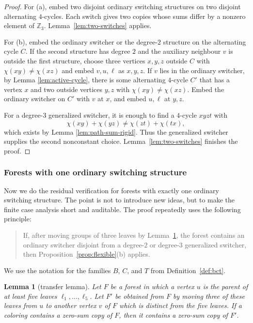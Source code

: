 \documentclass[11pt]{article}
\newtheorem{lemma}[theorem]{Lemma}
\newcommand{\Z}{\mathbb Z}
\begin{document}
\begin{proof}
For (a), embed two disjoint ordinary switching structures on two disjoint alternating $4$-cycles.  Each switch gives two copies whose sums differ by a nonzero element of $\Z_3$.  Lemma~\ref{lem:two-switches} applies.

For (b), embed the ordinary switcher or the degree-$2$ structure on the alternating cycle $C$.  If the second structure has degree $2$ and the auxiliary neighbour $v$ is outside the first structure, choose three vertices $x,y,z$ outside $C$ with $\chi(xy)\ne\chi(xz)$ and embed $v,u,\ell$ as $x,y,z$.  If $v$ lies in the ordinary switcher, by Lemma \ref{lem:active-cycle}, there is some alternating $4$-cycle $C'$ that has a vertex $x$ and two outside vertices $y,z$ with $\chi(xy)\ne\chi(xz)$.  Embed the ordinary switcher on $C'$ with $v$ at $x$, and embed $u,\ell$ at $y,z$.

For a degree-$3$ generalized switcher, it is enough to find a $4$-cycle $xyzt$ with
\[
        \chi(xy)+\chi(yz)\ne \chi(zt)+\chi(tx),
\]
which exists by Lemma \ref{lem:path-sum-rigid}.  Thus the generalized switcher supplies the second nonconstant choice.  Lemma~\ref{lem:two-switches} finishes the proof.
\end{proof}


\subsubsection{Forests with one ordinary switching structure}\label{subsubsec:oneswitch}

Now we do the residual verification for forests with exactly one ordinary switching structure.  The point is not to introduce new ideas, but to make the finite case analysis short and auditable.  The proof repeatedly uses the following principle:

\begin{quote}
If, after moving groups of three leaves by Lemma~\ref{lem:transfer}, the forest contains an ordinary switcher disjoint from a degree-$2$ or degree-$3$ generalized switcher, then Proposition~\ref{prop:flexible}(b) applies.
\end{quote}

We use the notation for the families $B$, $C$, and $T$ from Definition~\ref{def:bct}.



\begin{lemma}[transfer lemma]\label{lem:transfer}
Let $F$ be a forest in which a vertex $u$ is the parent of at least five leaves $\ell_1,\ldots,\ell_5$.  Let $F'$ be obtained from $F$ by moving three of these leaves from $u$ to another vertex $v$ of $F$ which is distinct from the five leaves.  If a coloring contains a zero-sum copy of $F$, then it contains a zero-sum copy of $F'$.
\end{lemma}
\end{document}
